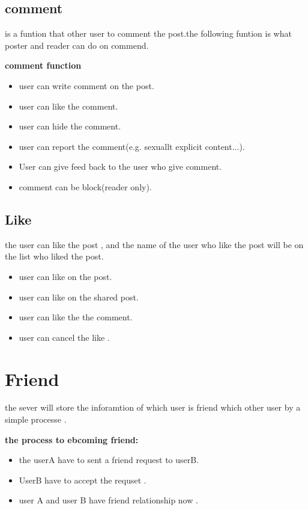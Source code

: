 \subsection{comment}
is a funtion that other user to comment the post.the following funtion is what
poster and reader can do on commend.

\textbf{comment function}
\begin{itemize}
\item user can write comment on the post.
\item user can like the comment.
\item user can hide the comment.
\item user can report the comment(e.g. sexuallt explicit content...).
\item User can give feed back to the user who give comment.
\item comment can be block(reader only).
\end{itemize}

\subsection{Like}
the user can like the post , and the name of the user who like the post will be
on the list who liked the post.

\begin{itemize}
\item user can like on the post.
\item user can like on the shared post.
\item user can like the the comment.
\item user can cancel the like .
\end{itemize}

\section{Friend}
the sever will store the inforamtion of which user is friend which other user by
a simple processe .

\textbf{the process to ebcoming friend:}
\begin{itemize}
\item the userA have to sent a friend request to userB.
\item UserB have to accept the requset .
\item user A and user B have friend relationship now .
\end{itemize}


